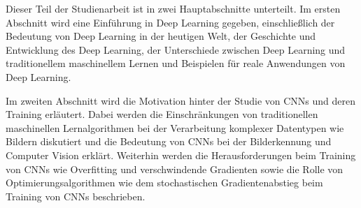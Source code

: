     

    Dieser Teil der Studienarbeit ist in zwei Hauptabschnitte unterteilt.
    Im ersten Abschnitt wird eine Einführung in Deep Learning gegeben, einschließlich der Bedeutung von Deep Learning in der heutigen Welt, der Geschichte und Entwicklung des Deep Learning, der Unterschiede zwischen Deep Learning und traditionellem maschinellem Lernen und Beispielen für reale Anwendungen von Deep Learning.
    
    Im zweiten Abschnitt wird die Motivation hinter der Studie von CNNs und deren Training erläutert. Dabei werden die Einschränkungen von traditionellen maschinellen Lernalgorithmen bei der Verarbeitung komplexer Datentypen wie Bildern diskutiert und die Bedeutung von CNNs bei der Bilderkennung und Computer Vision erklärt. Weiterhin werden die Herausforderungen beim Training von CNNs wie Overfitting und verschwindende Gradienten sowie die Rolle von Optimierungsalgorithmen wie dem stochastischen Gradientenabstieg beim Training von CNNs beschrieben.